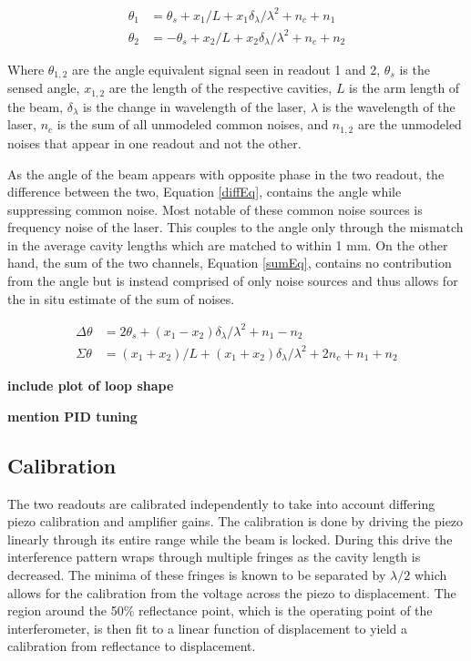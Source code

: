 \documentclass [12pt, proquest]{uwthesis}[2019]
\begin{document}
\begin{align}
\theta_1&=\theta_s+x_1/L+x_1 \delta_\lambda/\lambda^2+n_c+n_1 \label{th1} \\
\theta_2&=-\theta_s+x_2/L+x_2 \delta_\lambda/\lambda^2 + n_c+n_2 \label{th2}
\end{align}

Where $\theta_{1,2}$ are the angle equivalent signal seen in readout 1 and 2, $\theta_{s}$ is the sensed angle, $x_{1,2}$ are the length of the respective cavities, $L$ is the arm length of the beam, $\delta_\lambda$ is the change in wavelength of the laser, $\lambda$ is the wavelength of the laser, $n_c$ is the sum of all unmodeled common noises, and $n_{1,2}$ are the unmodeled noises that appear in one readout and not the other.

As the angle of the beam appears with opposite phase in the two readout, the difference between the two, Equation \ref{diffEq}, contains the angle while suppressing common noise. Most notable of these common noise sources is frequency noise of the laser. This couples to the angle only through the mismatch in the average cavity lengths which are matched to within 1 mm. On the other hand, the sum of the two channels, Equation \ref{sumEq}, contains no contribution from the angle but is instead comprised of only noise sources and thus allows for the in situ estimate of the sum of noises.


\begin{align}
\Delta \theta&=2\theta_s+ (x_1-x_2)\delta_\lambda/\lambda^2+n_1-n_2 \label{diffEq} \\
\Sigma \theta&=(x_1+x_2)/L+ (x_1+x_2)\delta_\lambda/\lambda^2+2n_c+n_1+n_2 \label{sumEq}
\end{align}

\textbf{include plot of loop shape}

\textbf{mention PID tuning}

\subsection{Calibration}

The two readouts are calibrated independently to take into account differing piezo calibration and amplifier gains. The calibration is done by driving the piezo linearly through its entire range while the beam is locked. During this drive the interference pattern wraps through multiple fringes as the cavity length is decreased. The minima of these fringes is known to be separated by $\lambda/2$ which allows for the calibration from the voltage across the piezo to displacement. The region around the 50\% reflectance point, which is the operating point of the interferometer, is then fit to a linear function of displacement to yield a calibration from reflectance to displacement.  
\end{document}
